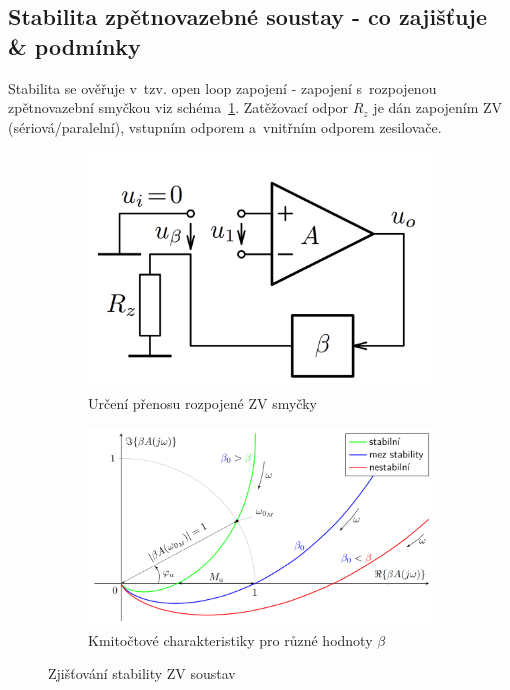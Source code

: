 \documentclass[a4paper,12pt]{article}   %
\begin{document}
\subsection*{Stabilita zpětnovazebné soustay - co zajišťuje \& podmínky}
Stabilita se ověřuje v~tzv. open loop zapojení - zapojení s~rozpojenou zpětnovazební smyčkou viz schéma~\ref{sch:zv:open:loop}. Zatěžovací odpor $R_z$ je dán zapojením ZV (sériová/paralelní), vstupním odporem a~vnitřním odporem zesilovače.
\begin{figure}[h!]
    \centering
    \begin{subfigure}{.45\textwidth}
        \centering
        \includegraphics[width=\textwidth]{ZV-open_loop.PNG}
        \caption{Určení přenosu rozpojené ZV smyčky}
        \label{sch:zv:open:loop}
    \end{subfigure}
    \begin{subfigure}{.45\textwidth}
        \centering
        \includegraphics[width=\textwidth]{stabilita_vice.PNG}
        \caption{Kmitočtové charakteristiky pro různé hodnoty $\beta$}
        \label{graf:stabilita}
    \end{subfigure}
    \caption{Zjišťování stability ZV soustav}
\end{figure}
\end{document}
